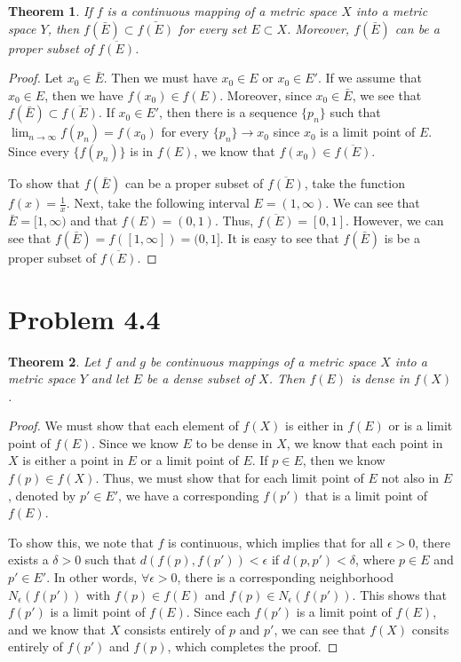 \documentclass[psamsfonts]{amsart}
\newtheorem{thm}{Theorem}[section]
\theoremstyle{definition}
\theoremstyle{remark}
\numberwithin{equation}{section}
\begin{document}
\begin{thm}
If $f$ is a continuous mapping of a metric space $X$ into a metric space $Y$, then $f(\bar{E}) \subset \bar{f(E)}$ for every set $E \subset X$. Moreover, $f(\bar{E})$ can be a proper subset of $\overline{f(E)}$. 
\end{thm}

\begin{proof}
Let $x_0 \in \bar{E}$. Then we must have $x_0 \in E$ or $x_0 \in E'$. If we assume that $x_0 \in E$, then we have $f(x_0) \in f(E)$. Moreover, since $x_0 \in \bar{E}$, we see that $f(\bar{E}) \subset \overline{f(E)}$. If $x_0 \in E'$, then there is a sequence $\{ p_n \}$ such that $\lim_{n \to \infty} f(p_n) = f(x_0)$ for every $\{ p_n \} \rightarrow x_0$ since $x_0$ is a limit point of $E$. Since every $ \{ f(p_n) \}$ is in $f(E)$, we know that $f(x_0) \in \overline{f(E)}$. 

To show that $f(\bar{E})$ can be a proper subset of $\overline{f(E)}$, take the function $f(x) = \frac{1}{x}$. Next, take the following interval $E = (1, \infty)$. We can see that $\bar{E} = [1,\infty)$ and that $f(E) = (0,1)$. Thus, $\overline{f(E)} = [0,1]$. However, we can see that $f(\bar{E}) = f([1,\infty]) = (0,1]$. It is easy to see that $f(\bar{E})$ is be a proper subset of $\overline{f(E)}$.
\end{proof}

\section{Problem 4.4}

\begin{thm}
Let $f$ and $g$ be continuous mappings of a metric space $X$ into a metric space $Y$ and let $E$ be a dense subset of $X$. Then $f(E)$ is dense in $f(X)$.
\end{thm}

\begin{proof}
We must show that each element of $f(X)$ is either in $f(E)$ or is a limit point of $f(E)$. Since we know $E$ to be dense in $X$, we know that each point in $X$ is either a point in $E$ or a limit point of $E$. If $p \in E$, then we know $f(p) \in f(X)$. Thus, we must show that for each limit point of $E$ not also in $E$, denoted by $p' \in E'$, we have a corresponding $f(p')$ that is a limit point of $f(E)$. 

To show this, we note that $f$ is continuous, which implies that for all $\epsilon > 0$, there exists a $\delta > 0$ such that $d( f(p), f(p')) < \epsilon$ if $d(p,p') < \delta$, where $p \in E$ and $p' \in E'$. In other words, $\forall \epsilon > 0$, there is a corresponding neighborhood $N_{\epsilon}( f(p'))$ with $f(p) \in f(E)$ and $f(p) \in N_{\epsilon}( f(p'))$. This shows that $f(p')$ is a limit point of $f(E)$. Since each $f(p')$ is a limit point of $f(E)$, and we know that $X$ consists entirely of $p$ and $p'$, we can see that $f(X)$ consits entirely of $f(p')$ and $f(p)$, which completes the proof.  
\end{proof}
\end{document}
